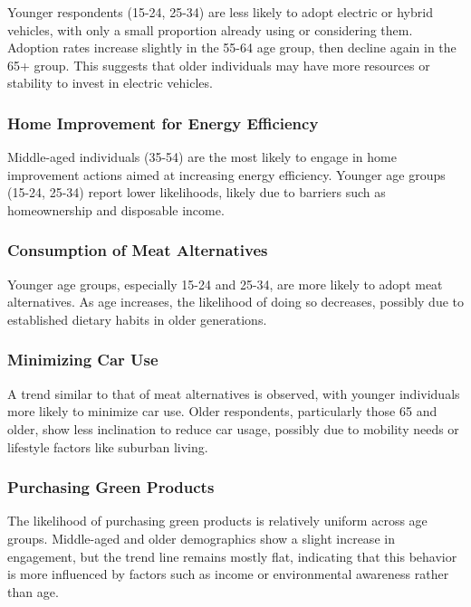 \documentclass[
  letterpaper,
  DIV=11,
  numbers=noendperiod]{scrartcl}
\begin{document}
Younger respondents (15-24, 25-34) are less likely to adopt electric or
hybrid vehicles, with only a small proportion already using or
considering them. Adoption rates increase slightly in the 55-64 age
group, then decline again in the 65+ group. This suggests that older
individuals may have more resources or stability to invest in electric
vehicles.

\subsubsection{Home Improvement for Energy
Efficiency}\label{home-improvement-for-energy-efficiency}

Middle-aged individuals (35-54) are the most likely to engage in home
improvement actions aimed at increasing energy efficiency. Younger age
groups (15-24, 25-34) report lower likelihoods, likely due to barriers
such as homeownership and disposable income.

\subsubsection{Consumption of Meat
Alternatives}\label{consumption-of-meat-alternatives}

Younger age groups, especially 15-24 and 25-34, are more likely to adopt
meat alternatives. As age increases, the likelihood of doing so
decreases, possibly due to established dietary habits in older
generations.

\subsubsection{Minimizing Car Use}\label{minimizing-car-use}

A trend similar to that of meat alternatives is observed, with younger
individuals more likely to minimize car use. Older respondents,
particularly those 65 and older, show less inclination to reduce car
usage, possibly due to mobility needs or lifestyle factors like suburban
living.

\subsubsection{Purchasing Green
Products}\label{purchasing-green-products}

The likelihood of purchasing green products is relatively uniform across
age groups. Middle-aged and older demographics show a slight increase in
engagement, but the trend line remains mostly flat, indicating that this
behavior is more influenced by factors such as income or environmental
awareness rather than age.
\end{document}
